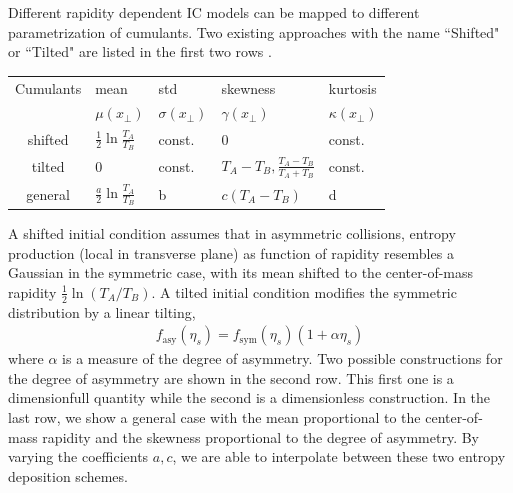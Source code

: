 \documentclass[aps,prl,twocolumn,groupedaddress]{revtex4-1}
\begin{document}
	Different rapidity dependent IC models can be mapped to different parametrization of cumulants. Two existing approaches with the name ``Shifted" or ``Tilted" are listed in the first two rows \cite{Bozek:2010bi}.
	\begin{widetext}
	\begin{center}
	\begin{tabularx}{0.8\textwidth}{c *{4}{Y}}
	\toprule[1pt]
	Cumulants & mean &	std	& skewness	& kurtosis \\
		&	$\mu(x_\perp)$ & $\sigma(x_\perp)$& $\gamma(x_\perp)$  & $\kappa(x_\perp)$	\\
	\midrule[0.5pt]
	shifted & $\frac{1}{2}\ln\frac{T_A}{T_B}$ & const. &  $0$	&const.\\
	tilted & $0$ & const.& $T_A - T_B, \frac{T_A-T_B}{T_A+T_B}$	& const.\\
	general & $\frac{a}{2}\ln\frac{T_A}{T_B}$& b  & $c(T_A - T_B)$ & d \\
	\bottomrule[1pt]
	\end{tabularx}
	\end{center}
	\end{widetext}
	A shifted initial condition assumes that in asymmetric collisions, entropy production (local in transverse plane) as function of rapidity resembles a Gaussian in the symmetric case, with its mean shifted to the center-of-mass rapidity $\frac{1}{2}\ln(T_A/T_B)$. 
	A tilted initial condition modifies the symmetric distribution by a linear tilting,
	\begin{eqnarray}
	f_{\textrm{asy}}(\eta_s) = f_{\textrm{sym}}(\eta_s) (1+\alpha \eta_s)
	\end{eqnarray}
	where $\alpha$ is a measure of the degree of asymmetry. 
	Two possible constructions for the degree of asymmetry are shown in the second row. 
	This first one is a dimensionfull quantity while the second is a dimensionless construction. 
	In the last row, we show a general case with the mean proportional to the center-of-mass rapidity and the skewness proportional to the degree of asymmetry. 
	By varying the coefficients $a, c$, we are able to interpolate between these two entropy deposition schemes.
	
\end{document}
